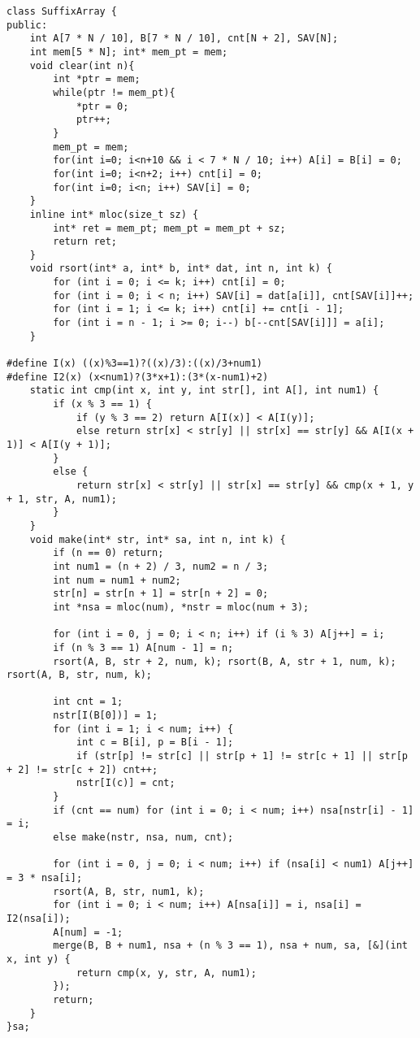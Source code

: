\documentclass[landscape, 8pt, a4paper, oneside, twocolumn]{extarticle}
\begin{document}
\begin{verbatim}
class SuffixArray {
public:
	int A[7 * N / 10], B[7 * N / 10], cnt[N + 2], SAV[N];
	int mem[5 * N]; int* mem_pt = mem;
	void clear(int n){
		int *ptr = mem;
		while(ptr != mem_pt){
			*ptr = 0;
			ptr++;
		}
		mem_pt = mem;
		for(int i=0; i<n+10 && i < 7 * N / 10; i++) A[i] = B[i] = 0;
		for(int i=0; i<n+2; i++) cnt[i] = 0;
		for(int i=0; i<n; i++) SAV[i] = 0;
	}
	inline int* mloc(size_t sz) {
		int* ret = mem_pt; mem_pt = mem_pt + sz;
		return ret;
	}
	void rsort(int* a, int* b, int* dat, int n, int k) { 
		for (int i = 0; i <= k; i++) cnt[i] = 0;
		for (int i = 0; i < n; i++) SAV[i] = dat[a[i]], cnt[SAV[i]]++;
		for (int i = 1; i <= k; i++) cnt[i] += cnt[i - 1];
		for (int i = n - 1; i >= 0; i--) b[--cnt[SAV[i]]] = a[i];
	}

#define I(x) ((x)%3==1)?((x)/3):((x)/3+num1)
#define I2(x) (x<num1)?(3*x+1):(3*(x-num1)+2)
	static int cmp(int x, int y, int str[], int A[], int num1) {
		if (x % 3 == 1) {
			if (y % 3 == 2) return A[I(x)] < A[I(y)];
			else return str[x] < str[y] || str[x] == str[y] && A[I(x + 1)] < A[I(y + 1)];
		}
		else {
			return str[x] < str[y] || str[x] == str[y] && cmp(x + 1, y + 1, str, A, num1);
		}
	}
	void make(int* str, int* sa, int n, int k) {
		if (n == 0) return;
		int num1 = (n + 2) / 3, num2 = n / 3;
		int num = num1 + num2;
		str[n] = str[n + 1] = str[n + 2] = 0;
		int *nsa = mloc(num), *nstr = mloc(num + 3);

		for (int i = 0, j = 0; i < n; i++) if (i % 3) A[j++] = i;
		if (n % 3 == 1) A[num - 1] = n;
		rsort(A, B, str + 2, num, k); rsort(B, A, str + 1, num, k); rsort(A, B, str, num, k);

		int cnt = 1;
		nstr[I(B[0])] = 1;
		for (int i = 1; i < num; i++) {
			int c = B[i], p = B[i - 1];
			if (str[p] != str[c] || str[p + 1] != str[c + 1] || str[p + 2] != str[c + 2]) cnt++;
			nstr[I(c)] = cnt;
		}
		if (cnt == num) for (int i = 0; i < num; i++) nsa[nstr[i] - 1] = i;
		else make(nstr, nsa, num, cnt);
		
		for (int i = 0, j = 0; i < num; i++) if (nsa[i] < num1) A[j++] = 3 * nsa[i];
		rsort(A, B, str, num1, k);
		for (int i = 0; i < num; i++) A[nsa[i]] = i, nsa[i] = I2(nsa[i]);
		A[num] = -1;
		merge(B, B + num1, nsa + (n % 3 == 1), nsa + num, sa, [&](int x, int y) {
			return cmp(x, y, str, A, num1); 
		});
		return;
	}
}sa;
\end{verbatim}
\end{document}
